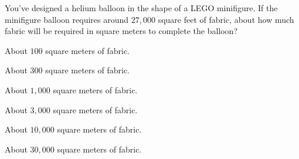 \documentclass{ximera}
\begin{document}
\begin{exercise}
You've designed a helium balloon in the shape of a LEGO minifigure. If
the minifigure balloon requires around $27,000$ square feet of fabric,
about how much fabric will be required in square meters to complete
the balloon?
\begin{enumerate}\begin{multicols}{2}
  \item About $100$ square meters of fabric.
  \item About $300$ square meters of fabric.
  \item About $1,000$ square meters of fabric.
  \item About $3,000$ square meters of fabric.
  \item About $10,000$ square meters of fabric.
  \item About $30,000$ square meters of fabric.
  \end{multicols}
\end{enumerate}
\end{exercise}






\end{document}
